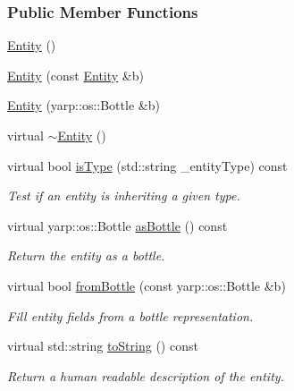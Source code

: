 \subsubsection*{Public Member Functions}
\begin{DoxyCompactItemize}
\item 
\hyperlink{group__icubclient__representations_a980f368aa07ce358583982821533a54a}{Entity} ()
\item 
\hyperlink{group__icubclient__representations_a102a6356e68520823918424453f89dd1}{Entity} (const \hyperlink{group__icubclient__representations_classicubclient_1_1Entity}{Entity} \&b)
\item 
\hyperlink{group__icubclient__representations_a10efef64904ff6927808373f488703d7}{Entity} (yarp\+::os\+::\+Bottle \&b)
\item 
virtual \hyperlink{group__icubclient__representations_afb1d60fc54152b596f18de2538688863}{$\sim$\+Entity} ()
\item 
virtual bool \hyperlink{group__icubclient__representations_a5cbd0e5e254b3881a6a0adfc28107eb5}{is\+Type} (std\+::string \+\_\+entity\+Type) const
\begin{DoxyCompactList}\small\item\em Test if an entity is inheriting a given type. \end{DoxyCompactList}\item 
virtual yarp\+::os\+::\+Bottle \hyperlink{group__icubclient__representations_a1481200655f5b88c81a9fa19941fd841}{as\+Bottle} () const
\begin{DoxyCompactList}\small\item\em Return the entity as a bottle. \end{DoxyCompactList}\item 
virtual bool \hyperlink{group__icubclient__representations_aba7fbff7372e12c9eacf7f458ba66478}{from\+Bottle} (const yarp\+::os\+::\+Bottle \&b)
\begin{DoxyCompactList}\small\item\em Fill entity fields from a bottle representation. \end{DoxyCompactList}\item 
virtual std\+::string \hyperlink{group__icubclient__representations_ad578a93701121f00ac7079fafad6c0e1}{to\+String} () const
\begin{DoxyCompactList}\small\item\em Return a human readable description of the entity. \end{DoxyCompactList}\item 

\end{DoxyCompactItemize}
